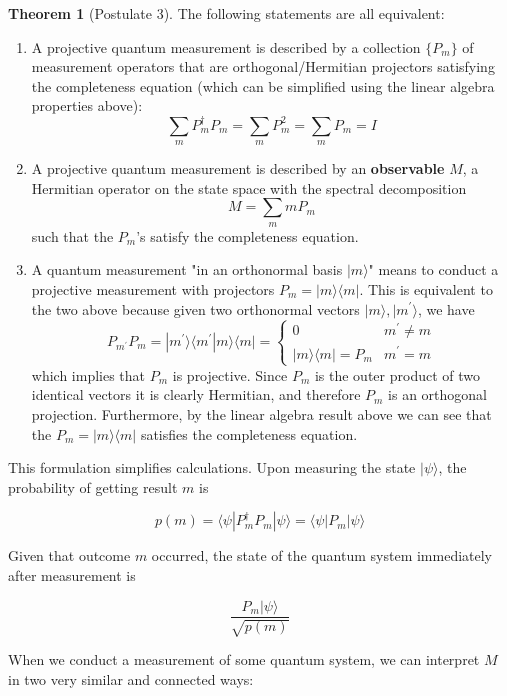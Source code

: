 \documentclass{article}
\theoremstyle{definition}
\newtheorem{theorem}{Theorem}[section]
\begin{document}
      \begin{theorem}[Postulate 3]
        The following statements are all equivalent:

        \begin{enumerate}
          \item A projective quantum measurement is described by a collection $\{P_m\}$ of measurement operators that are orthogonal/Hermitian projectors satisfying the completeness equation (which can be simplified using the linear algebra properties above):
            \[\sum_m P_m^\dagger P_m = \sum_m P_m^2 = \sum_m P_m = I\]
          \item A projective quantum measurement is described by an \textbf{observable} $M$, a Hermitian operator on the state space with the spectral decomposition
            \[M = \sum_m m P_m\]
          such that the $P_m$'s satisfy the completeness equation.
          \item A quantum measurement "in an orthonormal basis $|m\rangle$" means to conduct a projective measurement with projectors $P_m = |m \rangle \langle m |$. This is equivalent to the two above because given two orthonormal vectors $|m\rangle, |m^\prime \rangle$, we have
            \[P_{m^\prime} P_m = |m^\prime \rangle \langle m^\prime | m \rangle \langle m | = \begin{cases} 0 & m^\prime \neq m \\ |m \rangle \langle m | = P_m & m^\prime = m \end{cases}\]
          which implies that $P_m$ is projective. Since $P_m$ is the outer product of two identical vectors it is clearly Hermitian, and therefore $P_m$ is an orthogonal projection. Furthermore, by the linear algebra result above we can see that the $P_m = |m\rangle \langle m|$ satisfies the completeness equation.
        \end{enumerate}
      \end{theorem}

      This formulation simplifies calculations. Upon measuring the state $|\psi\rangle$, the probability of getting result $m$ is

        \[p(m) = \langle \psi | P_m^\dagger P_m | \psi \rangle = \langle \psi | P_m | \psi \rangle\]

      Given that outcome $m$ occurred, the state of the quantum system immediately after measurement is

        \[\frac{P_m |\psi \rangle}{\sqrt{ p(m)}}\]

      When we conduct a measurement of some quantum system, we can interpret $M$ in two very similar and connected ways:
\end{document}
